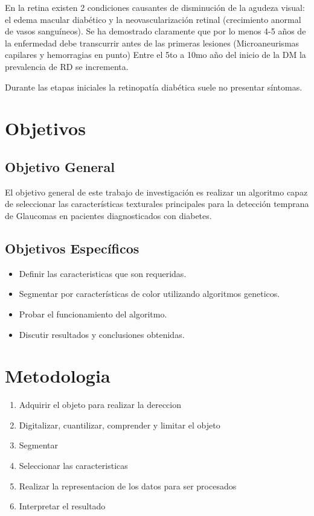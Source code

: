 \documentclass[12pt,letterpaper]{article}
\begin{document}
En la retina existen 2 condiciones causantes de disminución de la agudeza visual: el edema macular diabético y la neovascularización retinal (crecimiento anormal de vasos sanguíneos).\cite{Diagnosis4799} Se ha demostrado claramente que por lo menos 4-5 años de la enfermedad debe transcurrir antes de las primeras lesiones (Microaneurismas capilares y hemorragias en punto) Entre el 5to a 10mo año del inicio de la DM la prevalencia de RD se incrementa.\cite{Merino2019}


Durante las etapas iniciales la retinopatía diabética  suele no presentar síntomas.
\\
\newpage

\section{Objetivos}


\subsection{Objetivo General}


El objetivo general de este trabajo de investigación es realizar un algoritmo capaz de seleccionar las características texturales principales para la detección temprana de Glaucomas en pacientes diagnosticados con diabetes.
\\
\subsection{Objetivos Específicos}
\begin{itemize}
	\item Definir las caracteristicas que son requeridas.
	\item Segmentar por características de color utilizando algoritmos geneticos.
	\item Probar el funcionamiento del algoritmo.
	\item Discutir resultados y conclusiones obtenidas.
\end{itemize}
\newpage
\section{Metodologia}

\begin{enumerate}
	\item Adquirir el  objeto para realizar la dereccion
	\item Digitalizar, cuantilizar, comprender y limitar el objeto
	\item Segmentar
	\item Seleccionar las caracteristicas
	\item Realizar la representacion de los datos para ser procesados
	\item Interpretar el resultado
\end{enumerate}
\end{document}
